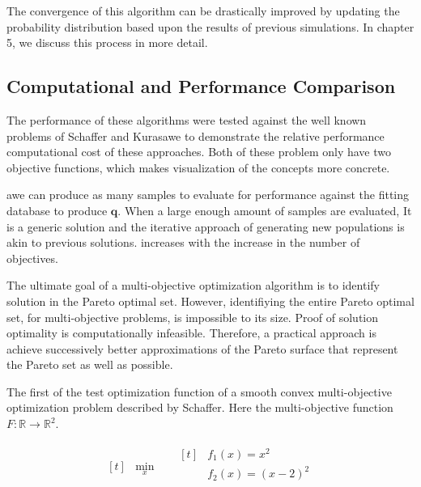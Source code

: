 The convergence of this algorithm can be drastically improved by updating the probability distribution based upon the results of previous simulations.  In chapter 5, we discuss this process in more detail.

\subsection{Computational and Performance Comparison}
 The performance of these algorithms were tested against the well known problems of Schaffer\cite{schaffer1984_pareto} and Kurasawe\cite{kursawe1991_pareto} to demonstrate the relative performance computational cost of these approaches.  Both of these problem only have two objective functions, which makes visualization of the concepts more concrete.

 awe can produce as many samples to evaluate for performance against the fitting database to produce $\bm{q}.$  When a large enough amount of samples are evaluated,
 It is a generic solution and the iterative approach of generating new populations is akin to previous solutions.
 increases with the increase in the number of objectives.

 The ultimate goal of a multi-objective optimization algorithm is to identify solution in the Pareto optimal set.  However, identifiying the entire Pareto optimal set, for multi-objective problems, is impossible to its size.  Proof of solution optimality is computationally infeasible.  Therefore, a practical approach is achieve successively better approximations of the Pareto surface that represent the Pareto set as well as possible.

 The first of the test optimization function of a smooth convex multi-objective optimization problem described by Schaffer\cite{schaffer1984_pareto}.  Here the multi-objective function $F:\mathbb{R} \rightarrow \mathbb{R}^2$.

 \begin{equation}
 \begin{aligned}[t]
   &\min_{x} \quad
      &\begin{aligned}[t]
            &f_1(x) = x^2 \\
            &f_2(x) = (x-2)^2 \\
       \end{aligned}
 \end{aligned}
 \end{equation}

